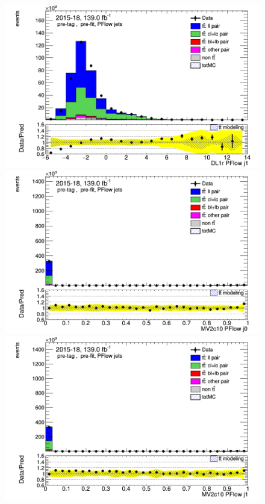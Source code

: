 \documentclass[letterpaper,12pt]{article}
\begin{document}
\begin{figure}[H]
\begin{minipage}[b]{.45\textwidth}
	\end{minipage}\hfill
	\begin{minipage}[b]{.45\textwidth}
	\centering
	\includegraphics[width=1\textwidth]{Oct_distributions/pretagNoRwDL1rwithhighpTPFlow_scaledall/DataMC__J1_DL1r.png}
	\end{minipage}\hfill
	\begin{minipage}[b]{.45\textwidth}
	\centering
	\includegraphics[width=1\textwidth]{Oct_distributions/pretagNoRwDL1rwithhighpTPFlow_scaledall/DataMC_J0_MV2c10.png}
	\end{minipage}\hfill
	\begin{minipage}[b]{.45\textwidth}
	\centering
	\includegraphics[width=1\textwidth]{Oct_distributions/pretagNoRwDL1rwithhighpTPFlow_scaledall/DataMC_J1_MV2c10.png}

\end{minipage}
\end{figure}
\end{document}
